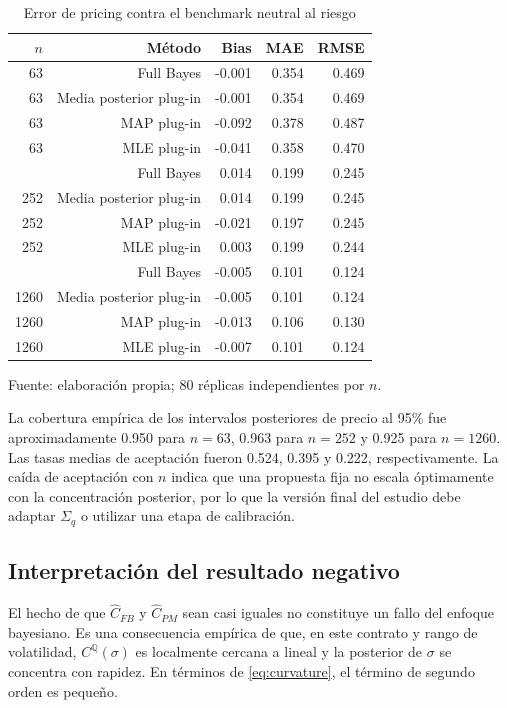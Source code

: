 \documentclass[12pt,letterpaper]{article}
\newcommand{\Qmeasure}{\mathbb{Q}}
\begin{document}
\begin{table}[H]
\centering
\caption{Error de pricing contra el benchmark neutral al riesgo}
\label{tab:rmse}
\begin{tabular}{rrrrr}
\toprule
$n$ & Método & Bias & MAE & RMSE \\
\midrule
63 & Full Bayes & -0.001 & 0.354 & 0.469 \\
63 & Media posterior plug-in & -0.001 & 0.354 & 0.469 \\
63 & MAP plug-in & -0.092 & 0.378 & 0.487 \\
63 & MLE plug-in & -0.041 & 0.358 & 0.470 \\
\addlinespace
252 & Full Bayes & 0.014 & 0.199 & 0.245 \\
252 & Media posterior plug-in & 0.014 & 0.199 & 0.245 \\
252 & MAP plug-in & -0.021 & 0.197 & 0.245 \\
252 & MLE plug-in & 0.003 & 0.199 & 0.244 \\
\addlinespace
1260 & Full Bayes & -0.005 & 0.101 & 0.124 \\
1260 & Media posterior plug-in & -0.005 & 0.101 & 0.124 \\
1260 & MAP plug-in & -0.013 & 0.106 & 0.130 \\
1260 & MLE plug-in & -0.007 & 0.101 & 0.124 \\
\bottomrule
\end{tabular}

\vspace{0.15cm}
\footnotesize Fuente: elaboración propia; 80 réplicas independientes por $n$.
\end{table}

La cobertura empírica de los intervalos posteriores de precio al 95\% fue aproximadamente 0.950 para $n=63$, 0.963 para $n=252$ y 0.925 para $n=1260$. Las tasas medias de aceptación fueron 0.524, 0.395 y 0.222, respectivamente. La caída de aceptación con $n$ indica que una propuesta fija no escala óptimamente con la concentración posterior, por lo que la versión final del estudio debe adaptar $\Sigma_q$ o utilizar una etapa de calibración.

\subsection{Interpretación del resultado negativo}

El hecho de que $\widehat C_{FB}$ y $\widehat C_{PM}$ sean casi iguales no constituye un fallo del enfoque bayesiano. Es una consecuencia empírica de que, en este contrato y rango de volatilidad, $C^{\Qmeasure}(\sigma)$ es localmente cercana a lineal y la posterior de $\sigma$ se concentra con rapidez. En términos de \eqref{eq:curvature}, el término de segundo orden es pequeño.
\end{document}
